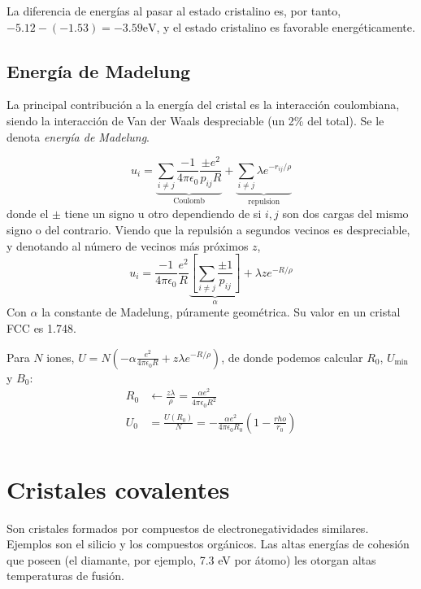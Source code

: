 La diferencia de energías al pasar al estado cristalino es, por tanto,
$-5.12 - (-1.53) = -3.59 \text{eV}$, y el estado cristalino es
favorable energéticamente.

\subsection{Energía de Madelung}
La principal contribución a la energía del cristal es la interacción
coulombiana, siendo la interacción de Van der Waals despreciable (un
2\% del total). Se le denota \emph{energía de Madelung}.

\begin{equation}
  u_i = \underbrace{\sum_{i\neq j} \frac{-1}{4\pi \epsilon_0} \frac{\pm
      e^2}{p_{ij}R}}_{\text{Coulomb}} + \underbrace{\sum_{i\neq j}
    \lambda e^{-r_{ij}/\rho}}_{\text{repulsion}}
\end{equation}
donde el $\pm$ tiene un signo u otro dependiendo de si $i,j$ son dos
cargas del mismo signo o del contrario. Viendo que la repulsión a
segundos vecinos es despreciable, y denotando al número de vecinos más
próximos $z$, 
\begin{equation}
  u_i  = \frac{-1}{4\pi \epsilon_0}\frac{e^2}{R}  \underbrace{\left[
  \sum_{i\neq j} \frac{\pm 1}{p_{ij}}\right]}_{\alpha} 
  + \lambda z e^{-R/\rho } 
\end{equation}
Con $\alpha$ la constante de Madelung, púramente geométrica. Su valor
en un cristal FCC es 1.748.

Para $N$ iones, $U = N(-\alpha \frac{e^2}{4\pi \epsilon_0 R} + z
\lambda e ^{-R/\rho})$, de donde podemos calcular $R_0$,
$U_{\text{min}}$ y $B_0$:
\begin{align}
  R_0  &\leftarrow \frac{z\lambda}{\rho} = \frac{\alpha e^2}{4\pi
  \epsilon_0 R^2} \\
  U_0 &= \frac{U(R_0)}{N} = - \frac{\alpha e^2}{4\pi \epsilon_0 R_0}
        \left( 1- \frac{rho}{r_0} \right) \\
\end{align}

\section{Cristales covalentes}
Son cristales formados por compuestos de electronegatividades
similares. Ejemplos son el silicio y los compuestos orgánicos. Las
altas energías de cohesión que poseen (el diamante, por ejemplo, 7.3
eV por átomo) les otorgan altas temperaturas de fusión.

